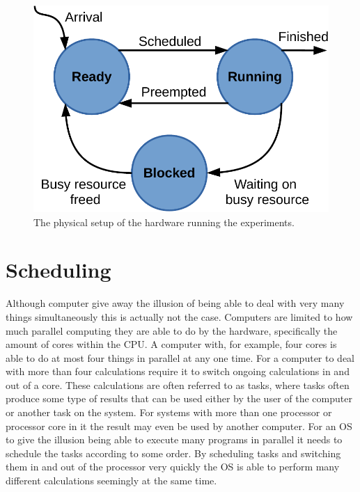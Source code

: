 \documentclass{kththesis}
\begin{document}
\begin{figure}

    \centering

    \includegraphics[scale=1\linewidth, bb=0 0 0 0]{images/ready-running-blocked-model.pdf}

    \caption{The physical setup of the hardware running the experiments.}

    \label{fig:experiment_setup}

\end{figure}


\section{Scheduling} \label{sec:scheduling}

Although computer give away the illusion of being able to deal with very many things simultaneously
this is actually not the case. Computers are limited to how much parallel computing they are able to
do by the hardware, specifically the amount of cores within the CPU. A computer with, for example, four cores is able to do at most four things in
parallel at any one time. For a computer to deal with more than four calculations require it to
switch ongoing calculations in and out of a core. These calculations are often referred to as tasks,
where tasks often produce some type of results that can be used either by the user of the computer
or another task on the system. For systems with more than one processor or processor core in it the
result may even be used by another computer. For an OS to give
the illusion being able to execute many programs in parallel it needs to schedule the tasks
according to some order. By scheduling tasks and switching them in and out of the processor very
quickly the OS is able to perform many different calculations seemingly at the same time.
\end{document}
